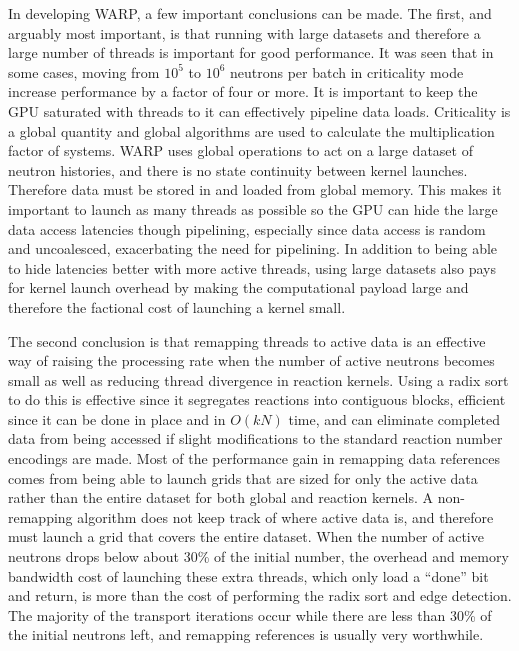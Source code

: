 In developing WARP, a few important conclusions can be made.  The first, and arguably most important, is that running with large datasets and therefore a large number of threads is important for good performance.  It was seen that in some cases, moving from $10^5$ to $10^6$ neutrons per batch in criticality mode increase performance by a factor of four or more.  It is important to keep the GPU saturated with threads to it can effectively pipeline data loads.  Criticality is a global quantity and global algorithms are used to calculate the multiplication factor of systems.  WARP uses global operations to act on a large dataset of neutron histories, and there is no state continuity between kernel launches.  Therefore data must be stored in and loaded from global memory.  This makes it  important to launch as many threads as possible so the GPU can hide the large data access latencies though pipelining, especially since data access is random and uncoalesced, exacerbating the need for pipelining.  In addition to being able to hide latencies better with more active threads, using large datasets also pays for kernel launch overhead by making the computational payload large and therefore the factional cost of launching a kernel small.

The second conclusion is that remapping threads to active data is an effective way of raising the processing rate when the number of active neutrons becomes small as well as reducing thread divergence in reaction kernels.  Using a radix sort to do this is effective since it segregates reactions into contiguous blocks, efficient since it can be done in place and in $O(kN)$ time, and can eliminate completed data from being accessed if slight modifications to the standard reaction number encodings are made.  Most of the performance gain in remapping data references comes from being able to launch grids that are sized for only the active data rather than the entire dataset for both global and reaction kernels.  A non-remapping algorithm does not keep track of where active data is, and therefore must launch a grid that covers the entire dataset.  When the number of active neutrons drops below about 30\% of the initial number, the overhead and memory bandwidth cost of launching these extra threads, which only load a ``done'' bit and return, is more than the cost of performing the radix sort and edge detection.  The majority of the transport iterations occur  while there are less than 30\% of the initial neutrons left, and remapping references is usually very worthwhile.


